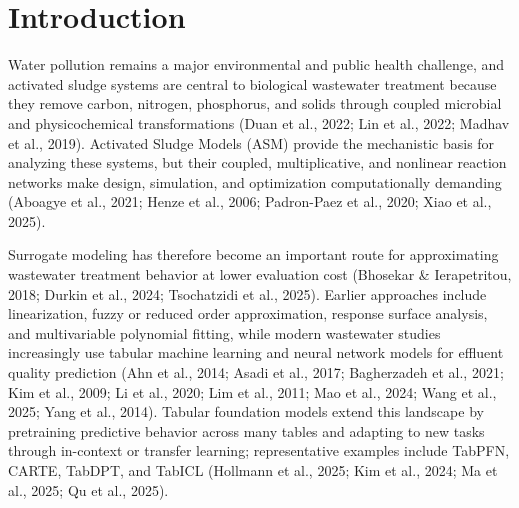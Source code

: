 \documentclass[a4paper,fleqn]{cas-sc}
\begin{document}
\section{Introduction}

Water pollution remains a major environmental and public health challenge, and activated sludge systems are central to biological wastewater treatment because they remove carbon, nitrogen, phosphorus, and solids through coupled microbial and physicochemical transformations (Duan et al., 2022; Lin et al., 2022; Madhav et al., 2019). Activated Sludge Models (ASM) provide the mechanistic basis for analyzing these systems, but their coupled, multiplicative, and nonlinear reaction networks make design, simulation, and optimization computationally demanding (Aboagye et al., 2021; Henze et al., 2006; Padron-Paez et al., 2020; Xiao et al., 2025).

Surrogate modeling has therefore become an important route for approximating wastewater treatment behavior at lower evaluation cost (Bhosekar \& Ierapetritou, 2018; Durkin et al., 2024; Tsochatzidi et al., 2025). Earlier approaches include linearization, fuzzy or reduced order approximation, response surface analysis, and multivariable polynomial fitting, while modern wastewater studies increasingly use tabular machine learning and neural network models for effluent quality prediction (Ahn et al., 2014; Asadi et al., 2017; Bagherzadeh et al., 2021; Kim et al., 2009; Li et al., 2020; Lim et al., 2011; Mao et al., 2024; Wang et al., 2025; Yang et al., 2014). Tabular foundation models extend this landscape by pretraining predictive behavior across many tables and adapting to new tasks through in-context or transfer learning; representative examples include TabPFN, CARTE, TabDPT, and TabICL (Hollmann et al., 2025; Kim et al., 2024; Ma et al., 2025; Qu et al., 2025).
\end{document}
